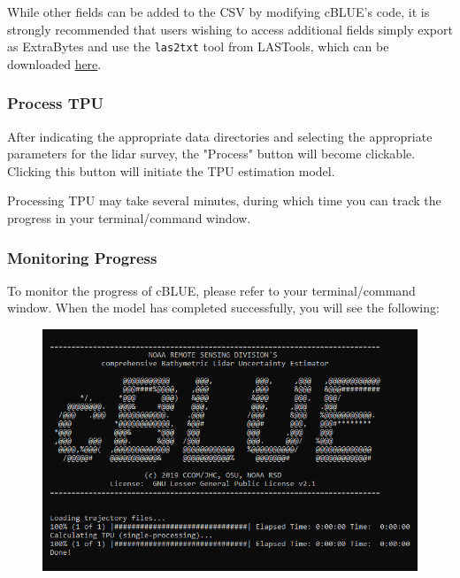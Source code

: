 \documentclass[11pt, a4paper]{article}
\begin{document}
While other fields can be added to the CSV by modifying cBLUE's code, it is strongly recommended that users wishing to access additional fields simply export as ExtraBytes and use the \texttt{las2txt} tool from LASTools, which can be downloaded \href{https://rapidlasso.com/las2txt/}{here}.


\subsubsection{Process TPU}
After indicating the appropriate data directories and selecting the appropriate parameters for the lidar survey, the "Process" button will become clickable. Clicking this button will initiate the TPU estimation model.

\begin{figure}[H]
    \centering
    \qquad
    \label{fig:example}
\end{figure}

Processing TPU may take several minutes, during which time you can track the progress in your terminal/command window.


\subsubsection{Monitoring Progress}
To monitor the progress of cBLUE, please refer to your terminal/command window. When the model has completed successfully, you will see the following:
\begin{figure}[H]
    \centering
    \includegraphics[width=16cm]{figs/successful_cblue_run.png}
\end{figure}
\end{document}
